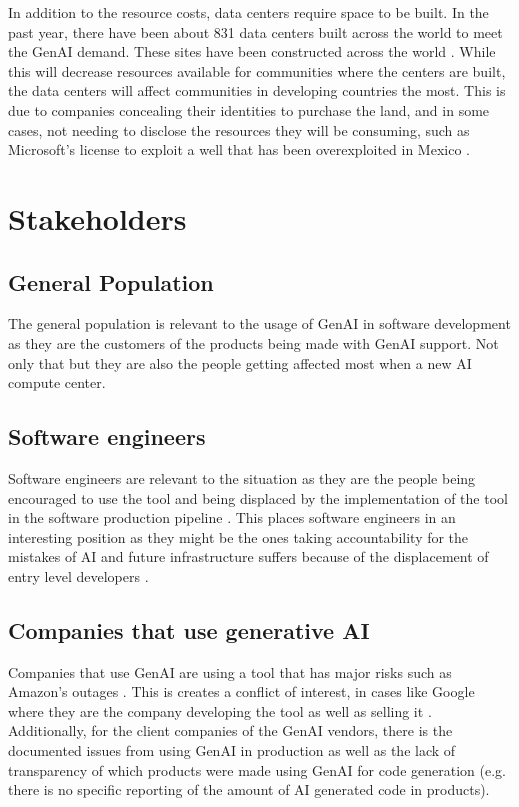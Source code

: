 In addition to the resource costs, data centers require space to be built. In the past year, there have been about 831 data centers built across the world to meet the GenAI demand. These sites have been constructed across the world \cite{construction-scaling}. While this will decrease resources available for communities where the centers are built, the data centers will affect communities in developing countries the most. This is due to companies concealing their identities to purchase the land, and in some cases, not needing to disclose the resources they will be consuming, such as Microsoft's license to exploit a well that has been overexploited in Mexico \cite{people-displacement}.

\section{Stakeholders}

\subsection{General Population}
The general population is relevant to the usage of GenAI in software development as they are the customers of the products being made with GenAI support. Not only that but they are also the people getting affected most when a new AI compute center.

\subsection{Software engineers}
Software engineers are relevant to the situation as they are the people being encouraged to use the tool and being displaced by the implementation of the tool in the software production pipeline \cite{jobs-stack-overflow, google-ai-use}. This places software engineers in an interesting position as they might be the ones taking accountability for the mistakes of AI and future infrastructure suffers because of the displacement of entry level developers \cite{ibm-accountability, stack-overflow-junior-shortage}.

\subsection{Companies that use generative AI}
Companies that use GenAI are using a tool that has major risks such as Amazon's outages \cite{amazon-ai-guard-rails}. This is creates a conflict of interest, in cases like Google where they are the company developing the tool as well as selling it \cite{google-ai-use}. Additionally, for the client companies of the GenAI vendors, there is the documented issues from using GenAI in production \cite{ai-bugs-paper} as well as the lack of transparency of which products were made using GenAI for code generation (e.g. there is no specific reporting of the amount of AI generated code in products).

